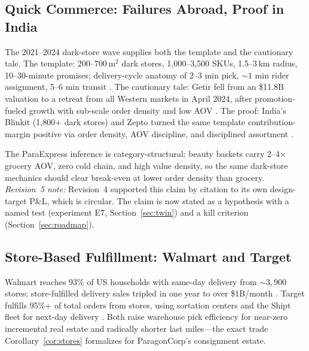 \subsection{Quick Commerce: Failures Abroad, Proof in India}
The 2021--2024 dark-store wave supplies both the template and the cautionary tale. The template: 200--700\,m$^2$ dark stores, 1,000--3,500 SKUs, 1.5--3\,km radius, 10--30-minute promises; delivery-cycle anatomy of 2--3 min pick, ${\sim}1$ min rider assignment, 5--6 min transit \cite{suitefleet2025,storyboard2025}. The cautionary tale: Getir fell from an \$11.8B valuation to a retreat from all Western markets in April 2024, after promotion-fueled growth with sub-scale order density and low AOV \cite{browne2024,sifted2024}. The proof: India's Blinkit (1,800+ dark stores) and Zepto turned the same template contribution-margin positive via order density, AOV discipline, and disciplined assortment \cite{mohan2025,storyboard2025}.

The ParaExpress inference is category-structural: beauty baskets carry 2--4$\times$ grocery AOV, zero cold chain, and high value density, so the same dark-store mechanics should clear break-even at lower order density than grocery. \emph{Revision~5 note:} Revision~4 supported this claim by citation to its own design-target P\&L, which is circular. The claim is now stated as a hypothesis with a named test (experiment E7, Section~\ref{sec:twin}) and a kill criterion (Section~\ref{sec:roadmap}). 

\subsection{Store-Based Fulfillment: Walmart and Target}
Walmart reaches 93\% of US households with same-day delivery from ${\sim}3{,}900$ stores; store-fulfilled delivery sales tripled in one year to over \$1B/month \cite{scd2025}. Target fulfills 95\%+ of total orders from stores, using sortation centers and the Shipt fleet for next-day delivery \cite{target2023}. Both raise warehouse pick efficiency for near-zero incremental real estate and radically shorter last miles---the exact trade Corollary~\ref{cor:stores} formalizes for ParagonCorp's consignment estate.

